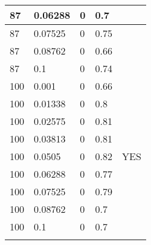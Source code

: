 \documentclass{article}%
\begin{document}
\begin{longtable}{l l l l l}
\hline%
87&0.06288&0&0.7&\\%
\hline%
87&0.07525&0&0.75&\\%
\hline%
87&0.08762&0&0.66&\\%
\hline%
87&0.1&0&0.74&\\%
\hline%
100&0.001&0&0.66&\\%
\hline%
100&0.01338&0&0.8&\\%
\hline%
100&0.02575&0&0.81&\\%
\hline%
100&0.03813&0&0.81&\\%
\hline%
100&0.0505&0&0.82&YES\\%
\hline%
100&0.06288&0&0.77&\\%
\hline%
100&0.07525&0&0.79&\\%
\hline%
100&0.08762&0&0.7&\\%
\hline%
100&0.1&0&0.7&\\%
\hline%
\endlastfoot%
\end{longtable}%
\end{document}
